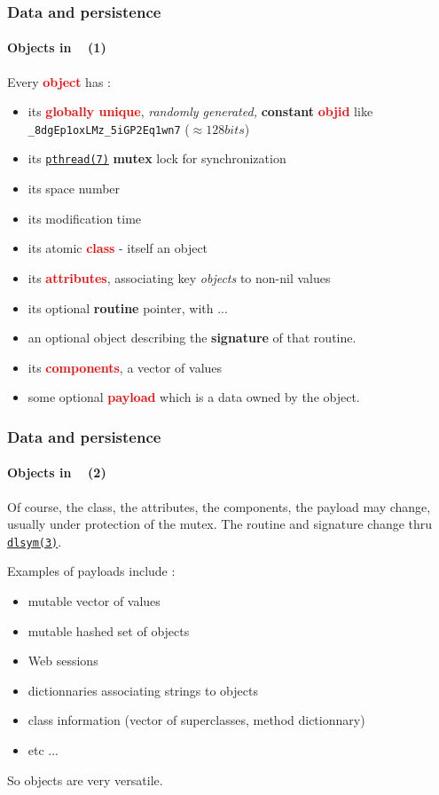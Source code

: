 \documentclass[xcolor=svgnames,final,smaller,a4]{beamer}
\begin{document}
\begin{frame}
    \frametitle{Data and persistence}
    \framesubtitle{Objects in \Bismon ~ (1)}

    Every \textcolor{red}{\textbf{object}} has : 
    \begin{itemize}
    \item its \textcolor{red}{\textbf{globally unique}}, \textit{randomly generated,}  \textbf{constant} \textcolor{red}{\textbf{objid}} like \texttt{\_8dgEp1oxLMz\_5iGP2Eq1wn7} ($\approx 128 bits$)
    \item its {\href{http://man7.org/linux/man-pages/man7/pthreads.7.html}{\texttt{pthread(7)}}} \textbf{mutex} lock for synchronization
    \item its space number
    \item its modification time
    \item its atomic {\textcolor{red}{\textbf{class}}} - itself an object
    \item its {\textcolor{red}{\textbf{attributes}}}, associating key \textit{objects} to non-nil values
    \item its optional \textbf{routine} pointer, with ...
    \item an optional object describing the \textbf{signature} of that routine.
  \item its {\textcolor{red}{\textbf{components}}}, a vector of values
  \item some optional {\textcolor{red}{\textbf{payload}}} which is a data owned by the object. 
    \end{itemize}

\end{frame}


\begin{frame}
    \frametitle{Data and persistence}
    \framesubtitle{Objects in \Bismon ~ (2)}
    
Of course, the class, the attributes, the components, the payload may
change, usually under protection of the mutex.  The routine and
signature change thru
{\href{http://man7.org/linux/man-pages/man3/dlsym.3.html}{\texttt{dlsym(3)}}}.

Examples of payloads include :
\begin{itemize}
\item mutable vector of values
\item mutable hashed set of objects
\item Web sessions
\item dictionnaries associating strings to objects
\item class information (vector of superclasses, method dictionnary)
\item etc ...
\end{itemize}

So objects are very versatile.
\end{frame}
\end{document}
